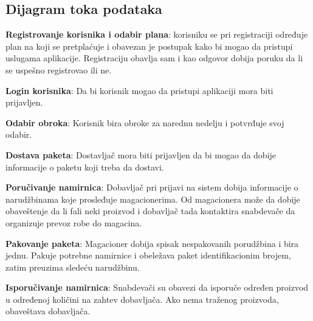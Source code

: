 \subsection{Dijagram toka podataka}
	\textbf{Registrovanje korisnika i odabir plana}: korisniku se pri registraciji određuje plan na koji se pretplaćuje i obavezan je postupak kako bi mogao da pristupi uslugama aplikacije. Registraciju obavlja sam i kao odgovor dobija poruku da li se uspešno registrovao ili ne.
	
	\textbf{Login korisnika}: Da bi korisnik mogao da pristupi aplikaciji mora biti prijavljen.
		
	\textbf{Odabir obroka}: Korisnik bira obroke za narednu nedelju i potvrđuje svoj odabir.
	
	
	\textbf{Dostava paketa}: Dostavljač mora biti prijavljen da bi mogao da dobije informacije o paketu koji treba da dostavi. 
	
	
	\textbf{Poručivanje namirnica}: Dobavljač pri prijavi na sistem dobija informacije o narudžbinama koje prosleđuje magacionerima. Od magacionera može da dobije obaveštenje da li fali neki proizvod i dobavljač tada kontaktira snabdevače da organizuje prevoz robe do magacina. 
	
	\textbf{Pakovanje paketa}: Magacioner dobija spisak nespakovanih porudžbina i bira jednu. Pakuje potrebne namirnice i obeležava paket identifikacionim brojem, zatim preuzima sledeću narudžbinu.
	
	\textbf{Isporučivanje namirnica}: Snabdevači su obavezi da isporuče određen proizvod u određenoj količini na zahtev dobavljača. Ako nema traženog proizvoda, obaveštava dobavljača.
	
